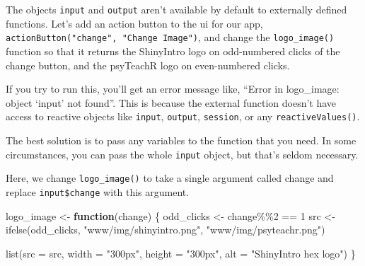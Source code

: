 \documentclass[
  oneside]{book}
\newenvironment{Shaded}{\begin{snugshade}}{\end{snugshade}}
\newcommand{\AttributeTok}[1]{\textcolor[rgb]{0.77,0.63,0.00}{#1}}
\newcommand{\ControlFlowTok}[1]{\textcolor[rgb]{0.13,0.29,0.53}{\textbf{#1}}}
\newcommand{\DecValTok}[1]{\textcolor[rgb]{0.00,0.00,0.81}{#1}}
\newcommand{\FunctionTok}[1]{\textcolor[rgb]{0.00,0.00,0.00}{#1}}
\newcommand{\NormalTok}[1]{#1}
\newcommand{\OtherTok}[1]{\textcolor[rgb]{0.56,0.35,0.01}{#1}}
\newcommand{\SpecialCharTok}[1]{\textcolor[rgb]{0.00,0.00,0.00}{#1}}
\newcommand{\StringTok}[1]{\textcolor[rgb]{0.31,0.60,0.02}{#1}}
\begin{document}
The objects \texttt{input} and \texttt{output} aren't available by default to externally defined functions. Let's add an action button to the ui for our app, \texttt{actionButton("change",\ "Change\ Image")}, and change the \texttt{logo\_image}\texttt{()} function so that it returns the ShinyIntro logo on odd-numbered clicks of the change button, and the psyTeachR logo on even-numbered clicks.

\begin{Shaded}
\end{Shaded}

If you try to run this, you'll get an error message like, ``Error in logo\_image: object `input' not found''. This is because the external function doesn't have access to reactive objects like \texttt{input}, \texttt{output}, \texttt{session}, or any \texttt{reactiveValues}\texttt{()}.

The best solution is to pass any variables to the function that you need. In some circumstances, you can pass the whole \texttt{input} object, but that's seldom necessary.

Here, we change \texttt{logo\_image}\texttt{()} to take a single argument called \AttributeTok{change} and replace \texttt{input\$change} with this argument.

\begin{Shaded}
\begin{Highlighting}[]
\NormalTok{logo\_image }\OtherTok{\textless{}{-}} \ControlFlowTok{function}\NormalTok{(change) \{}
\NormalTok{  odd\_clicks }\OtherTok{\textless{}{-}}\NormalTok{ change}\SpecialCharTok{\%\%}\DecValTok{2} \SpecialCharTok{==} \DecValTok{1}
\NormalTok{  src }\OtherTok{\textless{}{-}} \FunctionTok{ifelse}\NormalTok{(odd\_clicks, }
                \StringTok{"www/img/shinyintro.png"}\NormalTok{, }
                \StringTok{"www/img/psyteachr.png"}\NormalTok{)}
  
  \FunctionTok{list}\NormalTok{(}\AttributeTok{src =}\NormalTok{ src,}
       \AttributeTok{width =} \StringTok{"300px"}\NormalTok{,}
       \AttributeTok{height =} \StringTok{"300px"}\NormalTok{,}
       \AttributeTok{alt =} \StringTok{"ShinyIntro hex logo"}\NormalTok{)}
\NormalTok{\}}
\end{Highlighting}
\end{Shaded}
\end{document}

